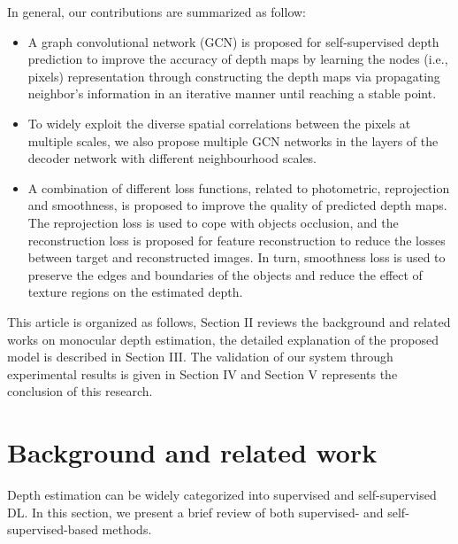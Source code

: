 \documentclass[journal]{IEEEtran}
\begin{document}
In general, our contributions are summarized as follow:

\begin{itemize}
    \item A graph convolutional network (GCN) is proposed for self-supervised depth prediction to improve the accuracy of depth maps by learning the nodes (i.e., pixels) representation through constructing the depth maps via propagating neighbor’s information in an iterative manner until reaching a stable point.
    \item To widely exploit the diverse spatial correlations between the pixels at multiple scales, we also propose multiple GCN networks in the layers of the decoder network with different neighbourhood scales.
    \item A combination of different loss functions, related to photometric, reprojection and smoothness, is proposed to improve the quality of predicted depth maps. The reprojection loss is used to cope with objects occlusion, and the reconstruction loss is proposed for feature reconstruction to reduce the losses between target and reconstructed images. In turn, smoothness loss is used to preserve the edges and boundaries of the objects and reduce the effect of texture regions on the estimated depth. 
\end{itemize}

This article is organized as follows, Section II reviews the background and related works on monocular depth estimation, the detailed explanation of the proposed model is described in Section III. The validation of our system through experimental results is given in Section IV and Section V represents the conclusion of this research.
\section{Background and related work}
Depth estimation can be widely categorized into supervised and self-supervised DL. In this section, we present a brief review of both supervised- and self-supervised-based methods.
\end{document}
